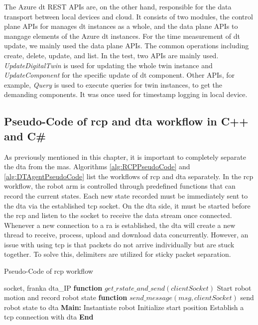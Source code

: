 The Azure \gls{dt} REST APIs are, on the other hand, responsible for the data 
transport between local devices and cloud. It consists of two modules, the 
control plane APIs for manages \gls{dt} instances as a whole, and the 
data plane APIs to mangage elements of the Azure \gls{dt} instances. For the 
time measurement of \gls{dt} update, we mainly used the data plane APIs. The 
common operations including create, delete, update, and list. In the test, two 
APIs are mainly used. \textit{UpdateDigitalTwin} is used for updating 
the whole twin instance 
and \textit{UpdateComponent} for the specific update of \gls{dt} component. 
Other APIs, for example, \textit{Query} is used to execute queries for twin 
instances, to get the demanding components. It was once used for timestamp 
logging in local device. 

\subsection{Pseudo-Code of \gls{rcp} and \gls{dta} workflow in C++ and C\#}\label{chap: RCPDTAPseudo}

As previously mentioned in this chapter, it is important to completely separate the 
\gls{dta} from the \gls{mas}. Algorithms \ref{alg:RCPPseudoCode} and 
\ref{alg:DTAgentPseudoCode} list the workflows of \gls{rcp} and \gls{dta} separately. 
In the \gls{rcp} workflow, the robot arm is controlled through predefined functions 
that can record the current states. Each new state recorded must be immediately sent 
to the \gls{dta} via the established \gls{tcp} socket. 
On the \gls{dta} side, it must be started before the \gls{rcp} and listen to the 
socket to receive the data stream once connected. Whenever a new connection to a 
\gls{ra} is established, the \gls{dta} will create a new thread to receive, process, 
upload and download data concurrently. 
However, an issue with using \gls{tcp} is that packets do not arrive individually 
but are stuck together. To solve this, delimiters are utilized for sticky packet separation.

\begin{breakablealgorithm}
    \caption{Pseudo-Code of \gls{rcp} workflow}
    \label{alg:RCPPseudoCode}
    \begin{algorithmic}
     socket, franka
     \gls{dta}\_IP
    \State \textbf{function} {$get\_rstate\_and\_send(clientSocket)$}
        \State \qquad Start robot motion and record robot state
        \State {}
    \State \textbf{function} {$send\_message(msg, clientSocket)$}
        \State \qquad send robot state to \gls{dta} 
    \State \textbf{Main:}
    \State \qquad Instantiate robot
    \State \qquad Initialize start position
    \State \qquad Establish a \gls{tcp} connection with \gls{dta}  
    \State {}
    \State \textbf{End}
    \end{algorithmic}
\end{breakablealgorithm}


